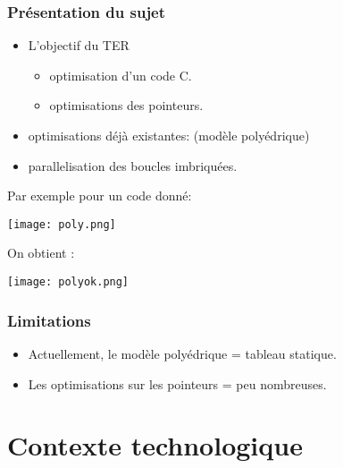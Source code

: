 \begin{frame}\frametitle{Présentation du sujet}
  \begin{itemize}

  \item L'objectif du TER 
    \begin{itemize}
    \item optimisation d'un code C.
    \item optimisations des pointeurs.
    \end{itemize}
  \item optimisations déjà existantes: (modèle polyédrique)
  \item parallelisation des boucles imbriquées.
  \end{itemize}

\end{frame}

\begin{frame}
  Par exemple pour un code donné:
  \begin{center}
     \texttt{[image: poly.png]}
  \end{center}
  On obtient : 
  \begin{center}
     \texttt{[image: polyok.png]}
  \end{center}


\end{frame}

\begin{frame}\frametitle{Limitations}

  \begin{itemize}

  \item Actuellement, le modèle polyédrique = tableau statique.
  \item Les optimisations sur les pointeurs = peu nombreuses.

  \end{itemize}
\end{frame}


\section{Contexte technologique} %

